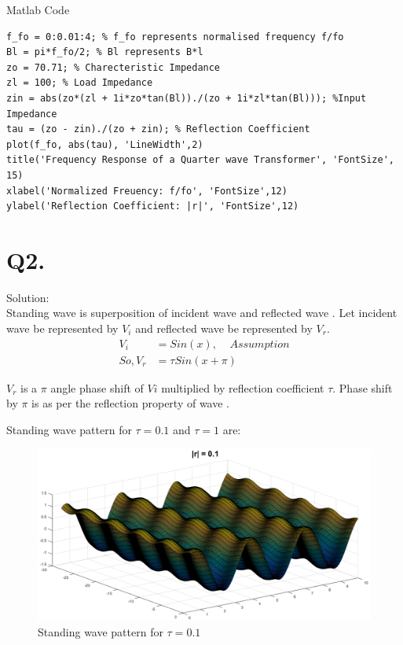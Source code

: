 Matlab Code
\begin{lstlisting}
f_fo = 0:0.01:4; % f_fo represents normalised frequency f/fo
Bl = pi*f_fo/2; % Bl represents B*l
zo = 70.71; % Charecteristic Impedance
zl = 100; % Load Impedance
zin = abs(zo*(zl + 1i*zo*tan(Bl))./(zo + 1i*zl*tan(Bl))); %Input Impedance
tau = (zo - zin)./(zo + zin); % Reflection Coefficient
plot(f_fo, abs(tau), 'LineWidth',2)
title('Frequency Response of a Quarter wave Transformer', 'FontSize', 15)
xlabel('Normalized Freuency: f/fo', 'FontSize',12)
ylabel('Reflection Coefficient: |r|', 'FontSize',12)
\end{lstlisting}


\section{Q2.} %
Solution:\\

Standing wave is superposition of incident wave and reflected wave \cite{link1}. Let incident wave be represented by $V_i$ and reflected wave be represented by $V_r$.
\begin{align*} 
V_i &= Sin(x), \;\;\;\; Assumption  \\
So, V_r &= \tau Sin(x + \pi)
\end{align*}

$V_r$ is a $\pi$ angle phase shift of $Vi$ multiplied by reflection coefficient $\tau.$ Phase shift by $\pi$ is as per the reflection property of wave \cite{link2}. 

Standing wave pattern for $\tau = 0.1$ and $\tau = 1$ are:
\begin{figure}[!ht]
	\centering
	\includegraphics[scale=0.45]{q2a.png}
	\caption{\label{q1} Standing wave pattern for $\tau = 0.1$}
\end{figure}

